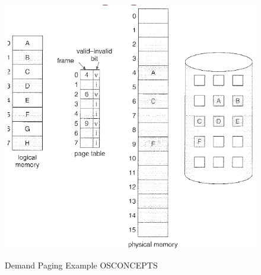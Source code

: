 \documentclass[10pt,a4paper]{article}
\begin{document}
\begin{figure}
\caption{Demand Paging Example {OSCONCEPTS}}
\begin{center}
\includegraphics[scale=0.45]{../images/demand-paging-example.png}
\label{demand-paging-example}
\end{center}
\end{figure}
\end{document}
